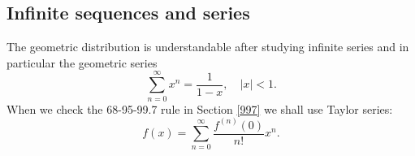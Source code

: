 
\subsection{Infinite sequences and series}
The geometric distribution is understandable after studying infinite series and in particular the geometric series
\[
	\sum_{n=0}^\infty x^n = \frac1{1-x},\quad |x|<1.
\]
When we check the 68-95-99.7 rule in Section \ref{997} we shall use Taylor series:
\[
f(x)=\sum_{n=0}^\infty \frac{f^{(n)}(0)}{n!}x^n.
\]
